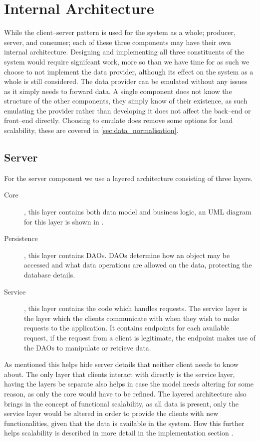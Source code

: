 \section{Internal Architecture}\label{sec:internal_architecture}
\label{subsec:internal_architecture}
While the client--server pattern is used for the system as a whole; producer, server, and consumer; each of these three components may have their own internal architecture.
Designing and implementing all three constituents of the system would require signifcant work, more so than we have time for as such we choose to not implement the data provider, although its effect on the system as a whole is still considered.
The data provider can be emulated without any issues as it simply needs to forward data.
A single component does not know the structure of the other components, they simply know of their existence, as such emulating the provider rather than developing it does not affect the back--end or front--end directly.
Choosing to emulate does remove some options for load scalability, these are covered in \cref{sec:data_normalisation}.

\subsection{Server}
For the server component we use a layered architecture consisting of three layers.
\begin{description}
    \item [Core], this layer contains both data model and business logic, an UML diagram for this layer is shown in .
    \item [Persistence], this layer contains \aclp{DAO}.
    \acsp{DAO} determine how an object may be accessed and what data operations are allowed on the data, protecting the database details.
    \item [Service], this layer contains the code which handles requests.
    The service layer is the layer which the clients communicate with when they wish to make requests to the application.
    It contains endpoints for each available request, if the request from a client is legitimate, the endpoint makes use of the \acsp{DAO} to manipulate or retrieve data.
\end{description}
As mentioned this helps hide server details that neither client needs to know about.
The only layer that clients interact with directly is the service layer, having the layers be separate also helps in case the model needs altering for some reason, as only the core would have to be refined.
The layered architecture also brings in the concept of functional scalability, as all data is present, only the service layer would be altered in order to provide the clients with new functionalities, given that the data is available in the system.
How this further helps scalability is described in more detail in the implementation section .

